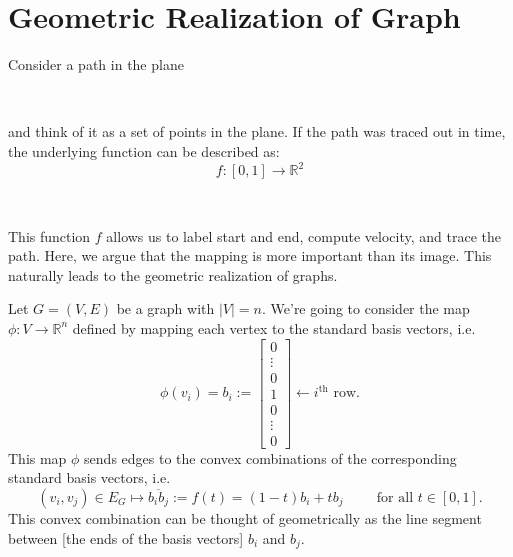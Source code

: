 \documentclass{article}
\def\R{\mathbb{R}}
\begin{document}
\section{Geometric Realization of Graph}
\begin{example}
Consider a path in the plane 
\begin{center}
    \\  
\end{center}

and think of it as a set of points in the plane. If the path was traced out in time, the underlying function can be described as:\\
\begin{equation*}
    f: [0, 1] \rightarrow {\mathbb{R}}^2
\end{equation*}

\begin{center}
    \\  
\end{center}
This function $f$ allows us to label start and end, compute velocity, and trace the path. Here, we argue that the mapping is more important than its image. This naturally leads to the geometric realization of graphs.
\end{example}

Let $G=(V,E)$ be a graph with $|V|=n$.  We're going to consider the map $\phi \colon V \to \R^n$ defined by mapping each vertex to the standard basis vectors, i.e.
\[
\phi(v_i)  = b_i := \begin{bmatrix} 0 \\ \vdots \\ 0 \\ 1 \\ 0 \\ \vdots \\ 0 
\end{bmatrix}
\leftarrow i^{\text{th}} \text{ row.}
\]
This map $\phi$ sends edges to the convex combinations of the corresponding standard basis vectors, i.e. 
\[
(v_i,v_j) \in E_G \longmapsto \overline{b_ib_j}:= f(t)= (1-t)b_i + tb_j \hspace{1cm} \text{for all }t\in[0,1].
\]
This convex combination can be thought of geometrically as the line segment between [the ends of the basis vectors] $b_i$ and $b_j$.  
\end{document}
